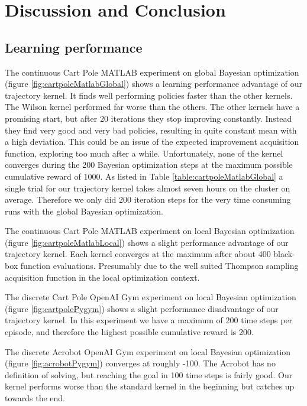 \chapter{Discussion and Conclusion}
\label{chap:6}

\section{Learning performance}
The continuous Cart Pole MATLAB experiment on global Bayesian optimization (figure \ref{fig:cartpoleMatlabGlobal}) shows a learning performance advantage of our trajectory kernel. It finds well performing policies faster than the other kernels. The Wilson kernel performed far worse than the others. The other kernels have a promising start, but after 20 iterations they stop improving constantly. Instead they find very good and very bad policies, resulting in quite constant mean with a high deviation. This could be an issue of the expected improvement acquisition function, exploring too much after a while. Unfortunately, none of the kernel converges during the 200 Bayesian optimization steps at the maximum possible cumulative reward of 1000. As listed in Table \ref{table:cartpoleMatlabGlobal} a single trial for our trajectory kernel takes almost seven hours on the cluster on average. Therefore we only did 200 iteration steps for the very time consuming runs with the global Bayesian optimization.

The continuous Cart Pole MATLAB experiment on local Bayesian optimization (figure \ref{fig:cartpoleMatlabLocal}) shows a slight performance advantage of our trajectory kernel. Each kernel converges at the maximum after about 400 black-box function evaluations. Presumably due to the well suited Thompson sampling acquisition function in the local optimization context.

The discrete Cart Pole OpenAI Gym experiment on local Bayesian optimization (figure \ref{fig:cartpolePygym}) shows a slight performance disadvantage of our trajectory kernel. In this experiment we have a maximum of 200 time steps per episode, and therefore the highest possible cumulative reward is 200.

The discrete Acrobot OpenAI Gym experiment on local Bayesian optimization (figure \ref{fig:acrobotPygym}) converges at roughly -100. The Acrobot has no definition of solving, but reaching the goal in 100 time steps is fairly good. Our kernel performs worse than the standard kernel in the beginning but catches up towards the end.

